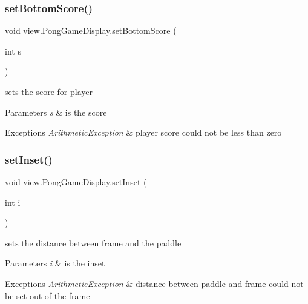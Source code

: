 \subsubsection{\texorpdfstring{set\+Bottom\+Score()}{setBottomScore()}}
{\footnotesize\ttfamily void view.\+Pong\+Game\+Display.\+set\+Bottom\+Score (\begin{DoxyParamCaption}\item[{int}]{s }\end{DoxyParamCaption})}



sets the score for player 


\begin{DoxyParams}{Parameters}
{\em s} & is the score \\
\hline
\end{DoxyParams}

\begin{DoxyExceptions}{Exceptions}
{\em Arithmetic\+Exception} & player score could not be less than zero \\
\hline
\end{DoxyExceptions}
\hypertarget{classview_1_1_pong_game_display_ac40ce3811b6118c530980d38aa48ec64}{}\label{classview_1_1_pong_game_display_ac40ce3811b6118c530980d38aa48ec64} 
\subsubsection{\texorpdfstring{set\+Inset()}{setInset()}}
{\footnotesize\ttfamily void view.\+Pong\+Game\+Display.\+set\+Inset (\begin{DoxyParamCaption}\item[{int}]{i }\end{DoxyParamCaption})}



sets the distance between frame and the paddle 


\begin{DoxyParams}{Parameters}
{\em i} & is the inset \\
\hline
\end{DoxyParams}

\begin{DoxyExceptions}{Exceptions}
{\em Arithmetic\+Exception} & distance between paddle and frame could not be set out of the frame \\
\hline
\end{DoxyExceptions}
\hypertarget{classview_1_1_pong_game_display_a5c855e1e459838b82e976cd957da5cc5}{}\label{classview_1_1_pong_game_display_a5c855e1e459838b82e976cd957da5cc5} 
